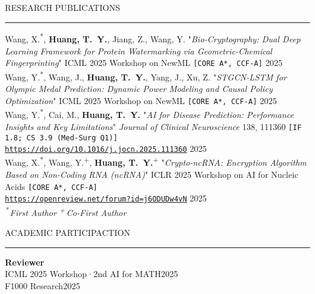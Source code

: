 \documentclass{resume} %
\renewenvironment{rSection}[1]{
\sectionskip
\textcolor{TsinghuaPurple}{\MakeUppercase{#1}}
\sectionlineskip
\hrule
\begin{list}{}{
\setlength{\leftmargin}{0em}
}
\item[]
}{
\end{list}
}
\begin{document}
\begin{rSection}{Research Publications}\itemsep -3pt         

{Wang, X.\textsuperscript{*}, \textbf{Huang, T.~Y.}, Jiang, Z., Wang, Y.  
"\textit{Bio\mbox{-}Cryptography: Dual Deep Learning Framework for Protein Watermarking via Geometric\mbox{-}Chemical Fingerprinting}"  
ICML 2025 Workshop on NewML} \texttt{\footnotesize [CORE A*, CCF-A]} \hfill 2025 \\
{Wang, Y.\textsuperscript{*}, Wang, J., \textbf{Huang, T.~Y.}, Yang, J., Xu, Z.  
"\textit{STGCN\mbox{-}LSTM for Olympic Medal Prediction: Dynamic Power Modeling and Causal Policy Optimization}"  
ICML 2025 Workshop on NewML} \texttt{\footnotesize [CORE A*, CCF-A]} \hfill 2025 \\
{Wang, Y.\textsuperscript{*}, Cai, M., \textbf{Huang, T.~Y.}  
"\textit{AI for Disease Prediction: Performance Insights and Key Limitations}"  
\textit{Journal of Clinical Neuroscience} 138, 111360} \texttt{\footnotesize [IF 1.8; CS 3.9 (Med-Surg Q1)]}\\
\href{https://openreview.net/forum?id=j6ODUDw4vN}{\texttt{https://doi.org/10.1016/j.jocn.2025.111360}} \hfill 2025 \\
{Wang, X.\textsuperscript{*}, Wang, Y.\textsuperscript{+}, \textbf{Huang, T.~Y.}\textsuperscript{+}  
"\textit{Crypto\mbox{-}ncRNA: Encryption Algorithm Based on Non\mbox{-}Coding RNA (ncRNA)}"  
ICLR 2025 Workshop on AI for Nucleic Acids} \texttt{\footnotesize [CORE A*, CCF-A]}\\
\href{https://openreview.net/forum?id=j6ODUDw4vN}{\texttt{https://openreview.net/forum?id=j6ODUDw4vN}} \hfill 2025 \\
\textit{\footnotesize \textsuperscript{*}\,First Author \quad \textsuperscript{+}\,Co-First Author}
\end{rSection}

\begin{rSection}{ACADEMIC PARTICIPACTION}\itemsep -3pt

{\bf Reviewer}\\
ICML 2025 Workshop·2nd AI for MATH\hfill 2025\\
F1000 Research\hfill 2025
\end{rSection}
\end{document}
